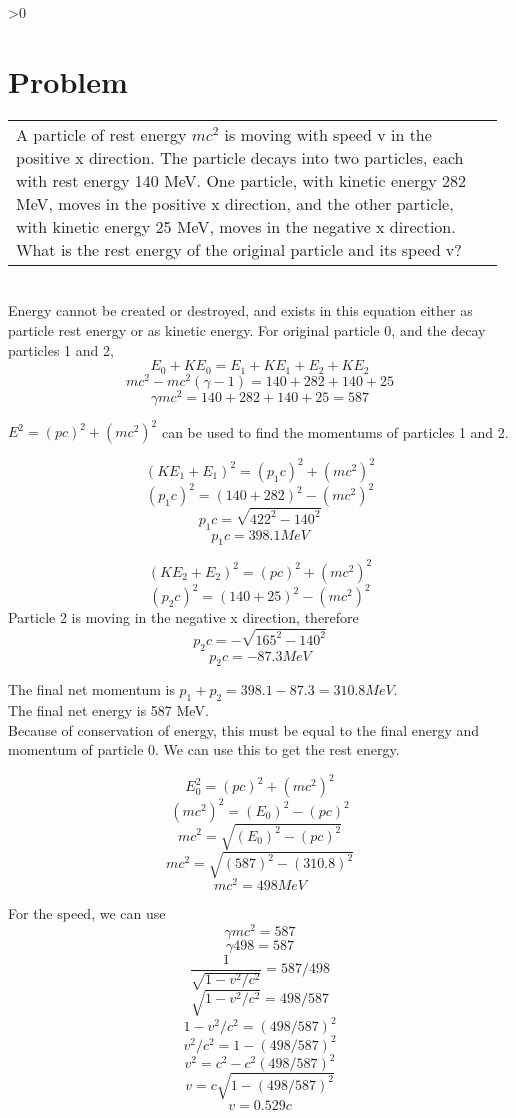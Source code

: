 \documentclass{article}
\newcounter{problemnumber}\setcounter{problemnumber}{1}
\newcommand{\problem}[1][-1]{
    \setcounter{partnumber}{1}
    \ifnum#1>0
        \setcounter{problemnumber}{#1}
    \fi
    \section*{Problem \arabic{problemnumber}}
    \stepcounter{problemnumber}
}
\newcounter{partnumber}\setcounter{partnumber}{1}
\newenvironment{question}{
    \color{gray}\itshape
    \vspace{5pt}
    \begin{tabular}{|p{0.97\linewidth}}
}{
    \end{tabular}\\[5pt]
}
\begin{document}
\newpage
\problem
\begin{question}
A particle of rest energy $mc^2$ is moving with speed v in the positive x direction. The particle decays into two particles, each with rest energy 140 MeV. One particle, with kinetic energy 282 MeV, moves in the positive x direction, and the other particle, with kinetic energy 25 MeV, moves in the negative x direction. What is the rest energy of the original particle and its speed v?  
\end{question}
Energy cannot be created or destroyed, and exists in this equation either as particle rest energy or as kinetic energy. For original particle 0, and the decay particles 1 and 2,
$$ E_0 + KE_0 = E_1 + KE_1 + E_2 + KE_2 $$
$$ mc^2 - mc^2(\gamma - 1) = 140 + 282 + 140 + 25 $$
$$ \gamma mc^2= 140 + 282 + 140 + 25 = 587 $$

$ E^2 = (pc)^2 + (mc^2)^2 $ can be used to find the momentums of particles 1 and 2.

$$ (KE_1 + E_1)^2 = (p_1c)^2 + (mc^2)^2 $$
$$ (p_1c)^2 = (140+282)^2 - (mc^2)^2 $$
$$ p_1c = \sqrt{422^2 - 140^2} $$
$$ p_1c = 398.1 MeV $$

$$ (KE_2 + E_2)^2 = (pc)^2 + (mc^2)^2 $$
$$ (p_2c)^2 = (140+25)^2 - (mc^2)^2 $$
Particle 2 is moving in the negative x direction, therefore
$$ p_2c = -\sqrt{165^2 - 140^2} $$
$$ p_2c = -87.3 MeV $$

The final net momentum is $p_1 + p_2 = 398.1-87.3 = 310.8 MeV$. \\
The final net energy is 587 MeV. \\
Because of conservation of energy, this must be equal to the final energy and momentum of particle 0. We can use this to get the rest energy.

$$ E_0^2 = (pc)^2 + (mc^2)^2 $$
$$ (mc^2)^2 = (E_0)^2 -(pc)^2 $$
$$ mc^2 = \sqrt{(E_0)^2 -(pc)^2} $$
$$ mc^2 = \sqrt{(587)^2 -(310.8)^2} $$
$$ mc^2 = 498 MeV $$

For the speed, we can use
$$ \gamma mc^2 = 587 $$
$$ \gamma 498 = 587 $$
$$ \frac{1}{\sqrt{1 - v^2/c^2}} = 587/498 $$
$$ \sqrt{1 - v^2/c^2} = 498/587 $$
$$ 1 - v^2/c^2 = (498/587)^2 $$
$$ v^2/c^2 = 1 - (498/587)^2 $$
$$ v^2 = c^2 - c^2(498/587)^2 $$
$$ v = c\sqrt{1 - (498/587)^2} $$
$$ v = 0.529c $$
\end{document}
